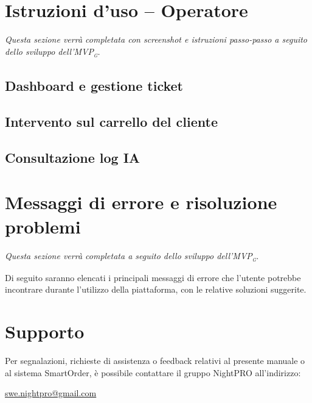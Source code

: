 \documentclass[a4paper, 11pt, oneside]{scrartcl}
\begin{document}
\section{Istruzioni d'uso -- Operatore}
\textit{Questa sezione verr\`a completata con screenshot e istruzioni passo-passo a seguito dello sviluppo dell'MVP\textsubscript{\textsc{g}}.}

\subsection{Dashboard e gestione ticket}

\subsection{Intervento sul carrello del cliente}

\subsection{Consultazione log IA}

\newpage
\section{Messaggi di errore e risoluzione problemi}
\textit{Questa sezione verr\`a completata a seguito dello sviluppo dell'MVP\textsubscript{\textsc{g}}.}

Di seguito saranno elencati i principali messaggi di errore che l'utente potrebbe incontrare durante l'utilizzo della piattaforma, con le relative soluzioni suggerite.


\newpage
\section{Supporto}
Per segnalazioni, richieste di assistenza o feedback relativi al presente manuale o al sistema SmartOrder, \`e possibile contattare il gruppo NightPRO all'indirizzo:

\begin{center}
    \large \href{mailto:swe.nightpro@gmail.com}{swe.nightpro@gmail.com}
\end{center}
\end{document}
